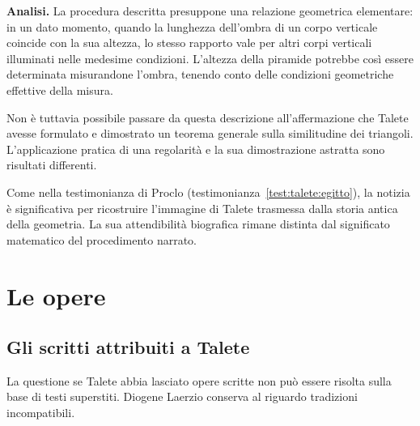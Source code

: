 

\noindent\textbf{Analisi.}
La procedura descritta presuppone una relazione geometrica elementare: in un dato momento, quando la lunghezza dell'ombra di un corpo verticale coincide con la sua altezza, lo stesso rapporto vale per altri corpi verticali illuminati nelle medesime condizioni. L'altezza della piramide potrebbe così essere determinata misurandone l'ombra, tenendo conto delle condizioni geometriche effettive della misura.

Non è tuttavia possibile passare da questa descrizione all'affermazione che Talete avesse formulato e dimostrato un teorema generale sulla similitudine dei triangoli. L'applicazione pratica di una regolarità e la sua dimostrazione astratta sono risultati differenti.

Come nella testimonianza di Proclo (testimonianza~\ref{test:talete:egitto}), la notizia è significativa per ricostruire l'immagine di Talete trasmessa dalla storia antica della geometria. La sua attendibilità biografica rimane distinta dal significato matematico del procedimento narrato.

\section{Le opere}

\subsection{Gli scritti attribuiti a Talete}

La questione se Talete abbia lasciato opere scritte non può essere risolta sulla base di testi superstiti. Diogene Laerzio conserva al riguardo tradizioni incompatibili.

